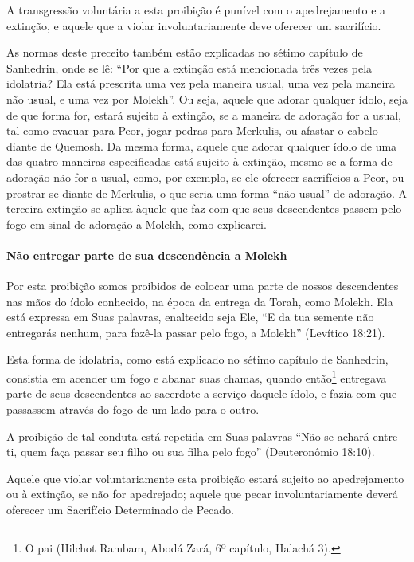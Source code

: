 A transgressão voluntária a esta proibição é punível com o apedrejamento
e a extinção, e aquele que a violar involuntariamente deve oferecer um
sacrifício.

As normas deste preceito também estão explicadas no sétimo capítulo de
Sanhedrin, onde se lê: ``Por que a extinção está mencionada três vezes
pela idolatria? Ela está prescrita uma vez pela maneira usual, uma vez
pela maneira não usual, e uma vez por Molekh''. Ou seja, aquele que
adorar qualquer ídolo, seja de que forma for, estará sujeito à extinção,
se a maneira de adoração for a usual, tal como evacuar para Peor, jogar
pedras para Merkulis, ou afastar o cabelo diante de Quemosh. Da mesma
forma, aquele que adorar qualquer ídolo de uma das quatro maneiras
especificadas está sujeito à extinção, mesmo se a forma de adoração não
for a usual, como, por exemplo, se ele oferecer sacrifícios a Peor, ou
prostrar-se diante de Merkulis, o que seria uma forma ``não usual'' de
adoração. A terceira extinção se aplica àquele que faz com que seus
descendentes passem pelo fogo em sinal de adoração a Molekh, como
explicarei.

\paragraph{Não entregar parte de sua descendência a Molekh}

Por esta proibição somos proibidos de colocar uma parte de nossos
descendentes nas mãos do ídolo conhecido, na época da entrega da Torah,
como Molekh. Ela está expressa em Suas palavras, enaltecido seja Ele,
``E da tua semente não entregarás nenhum, para fazê-la passar pelo fogo,
a Molekh'' (Levítico 18:21).

Esta forma de idolatria, como está explicado no sétimo capítulo de
Sanhedrin, consistia em acender um fogo e abanar suas chamas, quando
então\footnote{O pai (Hilchot Rambam, Abodá Zará, 6º capítulo, Halachá 3).} entregava parte de seus descendentes ao
sacerdote a serviço daquele ídolo, e fazia com que passassem através do
fogo de um lado para o outro.

A proibição de tal conduta está repetida em Suas palavras ``Não se
achará entre ti, quem faça passar seu filho ou sua filha pelo fogo''
(Deuteronômio 18:10).

Aquele que violar voluntariamente esta proibição estará sujeito ao
apedrejamento ou à extinção, se não for apedrejado; aquele que pecar
involuntariamente deverá oferecer um Sacrifício Determinado de Pecado.

